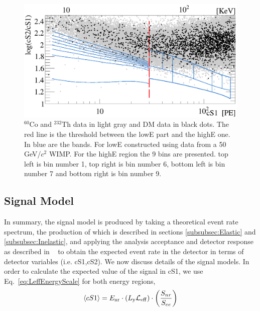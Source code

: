\begin{figure}[]
\begin{minipage}{1\linewidth}
\centerline{\includegraphics[width=1\linewidth]{Figures/eft_sr.eps}}
\end{minipage}
\caption{$^{60}\mathrm{Co}$ and $^{232}\mathrm{Th}$ data in light gray and DM data in black dots. The red line is the threshold between the lowE part and the highE one. In blue are the bands. For lowE constructed using data from a 50 GeV/$c^2$ WIMP. For the highE region the 9 bins are presented. top left is bin number 1,  top right is bin number 6, bottom left is bin number 7 and bottom right is bin number 9.}
\label{fig:phasespace}
\end{figure}  




\subsection{Signal Model}
\label{subsec:SignalModel}
In summary, the signal model is produced by taking a theoretical event rate spectrum, the production of which is described in sections \ref{subsubsec:Elastic} and \ref{subsubsec:Inelastic}, and applying the analysis acceptance and detector response as described in ~\cite{xe100_ana2012}  to obtain the expected event rate in the detector in terms of detector variables (i.e. cS1,cS2). We now discuss details of the signal models. In order to calculate the expected value of the signal in cS1, we use Eq.~\ref{eq:LeffEnergyScale} for both energy regions, 
\begin{equation}
\label{eq:LeffEnergyScale}
	\langle cS1 \rangle = E_{\mathrm{nr}} \cdot (L_{\mathrm{y}} \mathcal{L}_{\mathrm{eff}}) \cdot   \left(\frac{S_{nr}}{S_{ee}}\right) 
\end{equation}


